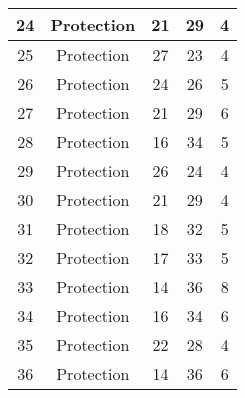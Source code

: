 \documentclass[results.tex]{subfiles}
\begin{document}
\begin{center}
\begin{tabular}{| c || c | c | c | c |}
            \hline
            24                      & Protection                   & 21                     & 29                      & 4                    \\
            \hline
            25                      & Protection                   & 27                     & 23                      & 4                    \\
            \hline
            26                      & Protection                   & 24                     & 26                      & 5                    \\
            \hline
            27                      & Protection                   & 21                     & 29                      & 6                    \\
            \hline
            28                      & Protection                   & 16                     & 34                      & 5                    \\
            \hline
            29                      & Protection                   & 26                     & 24                      & 4                    \\
            \hline
            30                      & Protection                   & 21                     & 29                      & 4                    \\
            \hline
            31                      & Protection                   & 18                     & 32                      & 5                    \\
            \hline
            32                      & Protection                   & 17                     & 33                      & 5                    \\
            \hline
            33                      & Protection                   & 14                     & 36                      & 8                    \\
            \hline
            34                      & Protection                   & 16                     & 34                      & 6                    \\
            \hline
            35                      & Protection                   & 22                     & 28                      & 4                    \\
            \hline
            36                      & Protection                   & 14                     & 36                      & 6                    \\

\end{tabular}
\end{center}
\end{document}
